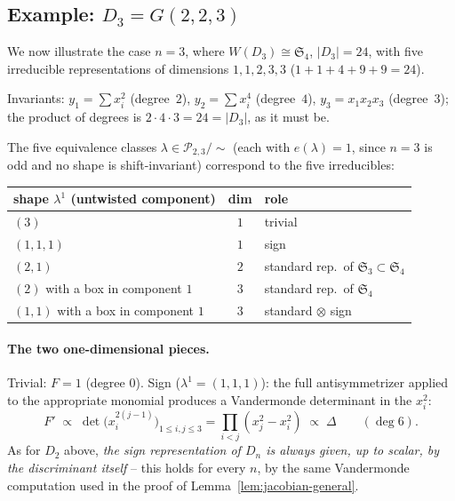 \documentclass[11pt,a4paper]{article}
\begin{document}
\subsection{Example: $D_3 = G(2,2,3)$}\label{subsec:D3-example}

We now illustrate the case $n=3$, where $W(D_3) \cong \mathfrak{S}_4$,
$|D_3|=24$, with five irreducible representations of dimensions
$1,1,2,3,3$ ($1+1+4+9+9=24$).

Invariants: $y_1=\sum x_i^2$ (degree~$2$), $y_2=\sum x_i^4$
(degree~$4$), $y_3=x_1x_2x_3$ (degree~$3$); the product of degrees is
$2\cdot4\cdot3=24=|D_3|$, as it must be.

The five equivalence classes $\lambda \in \mathcal{P}_{2,3}/\sim$ (each with
$e(\lambda)=1$, since $n=3$ is odd and no shape is shift-invariant)
correspond to the five irreducibles:

\begin{center}
\begin{tabular}{lcl}
shape $\lambda^1$ (untwisted component) & dim & role \\
\hline
$(3)$ & $1$ & trivial \\
$(1,1,1)$ & $1$ & sign \\
$(2,1)$ & $2$ & standard rep.\ of $\mathfrak{S}_3 \subset \mathfrak{S}_4$ \\
$(2)$ with a box in component $1$ & $3$ & standard rep.\ of $\mathfrak{S}_4$ \\
$(1,1)$ with a box in component $1$ & $3$ & standard $\otimes$ sign \\
\end{tabular}
\end{center}

\paragraph{The two one-dimensional pieces.}
Trivial: $F=1$ (degree $0$). Sign ($\lambda^1=(1,1,1)$): the full
antisymmetrizer applied to the appropriate monomial produces a
Vandermonde determinant in the $x_i^2$:
\[
 F' \;\propto\; \det\big(x_i^{2(j-1)}\big)_{1\le i,j\le3}
 = \prod_{i<j}(x_j^2-x_i^2) \;\propto\; \Delta \qquad (\deg 6).
\]
As for $D_2$ above, \emph{the sign representation of $D_n$
is always given, up to scalar, by the discriminant itself} -- this
holds for every $n$, by the same Vandermonde computation used in the
proof of Lemma~\ref{lem:jacobian-general}.
\end{document}
